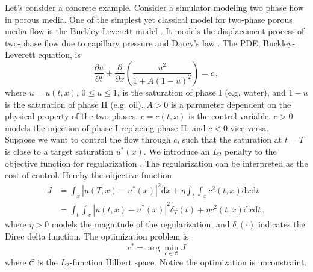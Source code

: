 \documentclass[a4paper,onecolumn]{article}
\theoremstyle{remark}
\begin{document}
\noindent Let's consider a concrete example. Consider a simulator modeling two phase flow in porous media.
One of the simplest yet classical model for two-phase porous media flow is the Buckley-Leverett model \cite{Buckley Leverett}. 
It models the displacement process of two-phase flow due to capillary pressure and Darcy's law \cite{Reservoir Simulation Book}.
The PDE, Buckley-Leverett equation, is
\begin{equation}
     \frac{\partial u}{\partial t} + \frac{\partial}{\partial x} \left(\frac{u^2}{1+A(1-u)^2}\right) = c\,,
\end{equation}
where $u = u(t,x)$, $0\le u\le 1$, is the saturation of phase I (e.g. water), and $1-u$ is the saturation of
phase II (e.g. oil). $A>0$ is a parameter dependent on the physical property of the two phases.
$c=c(t,x)$ is the control variable. $c>0$ models the injection of phase I replacing phase II; and $c<0$ vice versa.\\

\noindent Suppose we want to control the flow through $c$, such that the saturation at $t=T$ is close to 
a target saturation $u^*(x)$. We introduce an $L_2$ penalty to the objective function for regularization \cite{Boyd optimization}.
The regularization can be interpreted as the cost of control. Hereby the objective function
\begin{equation}\begin{split}
    J &= \int_x \left|u(T,x) - u^*(x)\right|^2 \textrm{d}x + \eta \int_t\int_x  c^2(t,x) \textrm{d}x\textrm{d}t\\
      &= \int_t \int_x \left|u(t,x) - u^*(x)\right|^2 \delta_T(t) + \eta c^2(t,x) \textrm{d}x \textrm{d}t \,,
\end{split}\end{equation}
where $\eta>0$ models the magnitude of the regularization, and $\delta_\cdot(\cdot)$ indicates the Direc delta function.
The optimization problem is
\begin{equation}
    c^* = \arg\min_{c\in \mathcal{C}} J
\end{equation}
where $\mathcal{C}$ is the $L_2$-function Hilbert space. Notice the optimization is unconstraint.\\
\end{document}
